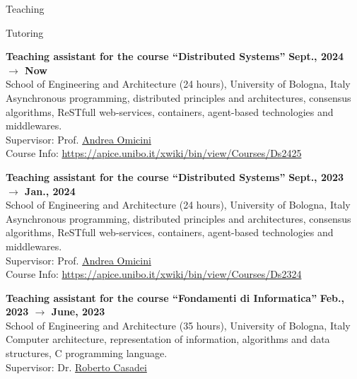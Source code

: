 \documentclass{resume} %
\begin{document}
    \begin{rSection}{Teaching}


        \begin{rSubsection2}{Tutoring}
            \item\textbf{Teaching assistant for the course ``Distributed Systems'' }\hfill \textbf{Sept., 2024 $\rightarrow$ Now}
            \\School of Engineering and Architecture (24 hours), University of Bologna, Italy
            \\Asynchronous programming, distributed principles and architectures, consensus algorithms, ReSTfull web-services, containers, agent-based technologies and middlewares.
            \\Supervisor: Prof. \href{mailto:andrea.omicini@unibo.it}{Andrea Omicini}
            \\Course Info: \url{https://apice.unibo.it/xwiki/bin/view/Courses/Ds2425}
            \item\textbf{ Teaching assistant for the course ``Distributed Systems'' }\hfill \textbf{Sept., 2023 $\rightarrow$ Jan., 2024}
            \\School of Engineering and Architecture (24 hours), University of Bologna, Italy
            \\Asynchronous programming, distributed principles and architectures, consensus algorithms, ReSTfull web-services, containers, agent-based technologies and middlewares.
            \\Supervisor: Prof. \href{mailto:andrea.omicini@unibo.it}{Andrea Omicini}
            \\Course Info: \url{https://apice.unibo.it/xwiki/bin/view/Courses/Ds2324}
            \item\textbf{ Teaching assistant for the course ``Fondamenti di Informatica'' }\hfill \textbf{Feb., 2023 $\rightarrow$ June, 2023}
            \\School of Engineering and Architecture (35 hours), University of Bologna, Italy
            \\Computer architecture, representation of information, algorithms and data structures, C programming language.
            \\Supervisor: Dr. \href{mailto:roberto.casadei@unibo.it}{Roberto Casadei}

\end{rSubsection2}
\end{rSection}
\end{document}
